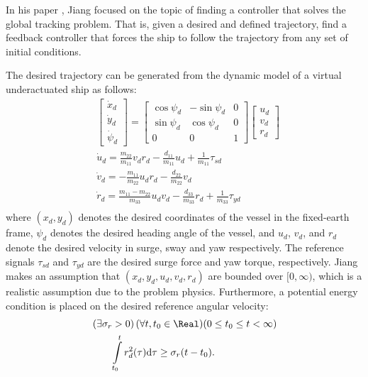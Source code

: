 \documentclass[amsthm, twocolumn]{autart}
\begin{document}
In his paper \cite{Jiang02}, Jiang focused on the topic of finding a controller that solves the global tracking problem. That is, given a desired and defined trajectory, find a feedback controller that forces the ship to follow the trajectory from any set of initial conditions. 

The desired trajectory can be generated from the dynamic model of a virtual underactuated ship as follows:
%
%
\begin{equation}
\begin{aligned}
& \begin{bmatrix} \dot{x}_{d} \\  \dot{y}_{d} \\  \dot{\psi}_{d} \end{bmatrix}
 =
\begin{bmatrix} 
\cos\psi_{d}  	& -\sin\psi_{d}	 	& 0 \\  
\sin\psi_{d} 	& \cos\psi_{d} 		& 0\\  
0 			& 0				& 1
\end{bmatrix}
\begin{bmatrix} u_{d} \\  v_{d} \\  r_{d} \end{bmatrix} \\
& \dot{u}_{d} =\frac{m_{22}}{m_{11}}v_{d}r_{d}-\frac{d_{11}}{m_{11}}u_{d}+\frac{1}{m_{11}}\tau_{sd} \\
& \dot{v}_{d} =-\frac{m_{11}}{m_{22}}u_{d}r_{d}-\frac{d_{22}}{m_{22}}v_{d} \\
& \dot{r}_{d} =\frac{m_{11}-m_{22}}{m_{33}}u_{d}v_{d}-\frac{d_{33}}{m_{33}}r_{d}+\frac{1}{m_{33}}\tau_{yd} \\
\end{aligned}
\label{eq:shipsys2}
\end{equation}
%
%
where $(x_{d},y_{d})$ denotes the desired coordinates of the vessel in the fixed-earth frame, $\psi_{d}$ denotes the desired heading angle of the vessel, and $u_{d}$, $v_{d}$, and $r_{d}$ denote the desired velocity in surge, sway and yaw respectively. The reference signals $\tau_{sd}$ and $\tau_{yd}$ are the desired surge force and yaw torque, respectively. Jiang makes an assumption that $(x_{d},y_{d},u_{d},v_{d},r_{d})$ are bounded over $[0,\infty)$, which is a realistic assumption due to the problem physics. Furthermore, a potential energy condition is placed on the desired reference angular velocity:
%
%
\begin{equation}
\begin{split}
& \left(\exists \sigma_{r} > 0\right)(\forall t,t_0\in\Real)(0 \le t_0 \le t < \infty) \\
& \qquad\int_{t_0}^t r_d^2(\tau)\mathrm{d}\tau \geq \sigma_r(t-t_0).
\end{split}
\label{eq:H}
\end{equation}
\end{document}
